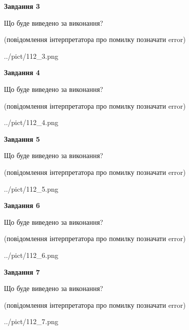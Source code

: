 \documentclass[12pt, ukrainian]{article}
\begin{document}
{\begin {large}
{\begin {center}\textbf{Завдання 3}\end {center}}\par
Що буде виведено за виконання?\par
 (повідомлення інтерпретатора про помилку позначати error)\par
\begin{center}
	{../pict/112_3.png}
\end{center}
\newpage

{\begin {center}\textbf{Завдання 4}\end {center}}\par
Що буде виведено за виконання?\par
 (повідомлення інтерпретатора про помилку позначати error)\par
\begin{center}
	{../pict/112_4.png}
\end{center}
\newpage

{\begin {center}\textbf{Завдання 5}\end {center}}\par
Що буде виведено за виконання?\par
 (повідомлення інтерпретатора про помилку позначати error)\par
\begin{center}
	{../pict/112_5.png}
\end{center}
\newpage

{\begin {center}\textbf{Завдання 6}\end {center}}\par
Що буде виведено за виконання?\par
 (повідомлення інтерпретатора про помилку позначати error)\par
\begin{center}
	{../pict/112_6.png}
\end{center}
\newpage

{\begin {center}\textbf{Завдання 7}\end {center}}\par
Що буде виведено за виконання?\par
 (повідомлення інтерпретатора про помилку позначати error)\par
\begin{center}
	{../pict/112_7.png}
\end{center}
\newpage


\end{large}}
\end{document}
